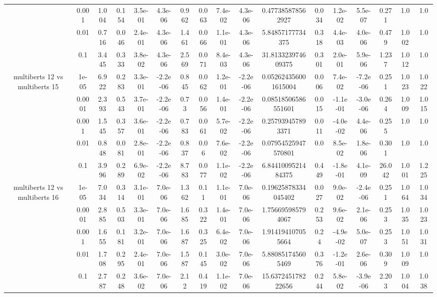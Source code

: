 \begin{tabular}{|c|c|c|c|c|c|c|c|c|c|c|c|c|c|c|c|c|}
 & 0.001 & 1.004 & 0.154 & 3.5e-01 & 4.3e-06 & 0.962 & 0.063 & 7.4e-02 & 4.3e-06 & 0.477385878562927 & 0.034 & 1.2e-02 & 5.5e-07 & 0.271 & 1.0 & 1.0 \\
 & 0.01 & 0.716 & 0.046 & 2.4e-01 & 4.3e-06 & 1.461 & 0.066 & 1.1e-01 & 4.3e-06 & 5.84857177734375 & 0.318 & 4.4e-03 & 4.0e-06 & 0.479 & 1.002 & 1.0 \\
 & 0.1 & 3.445 & 0.333 & 3.8e-02 & 4.3e-06 & 2.569 & 0.071 & 8.4e-03 & 4.3e-06 & 31.813323974609375 & 0.301 & 2.0e-01 & 5.9e-06 & 1.237 & 1.012 & 1.0 \\
\hline
\multirow{5}{*}{multiberts 12 vs multiberts 15} & 1e-05 & 6.922 & 0.283 & 3.3e-01 & -2.2e-06 & 0.845 & 0.062 & 1.2e-01 & -2.2e-06 & 0.052624356001615004 & 0.006 & 7.4e-02 & -7.2e-06 & 0.251 & 1.023 & 1.022 \\
 & 0.0001 & 2.393 & 0.543 & 3.7e-01 & -2.2e-06 & 0.73 & 0.056 & 1.4e-01 & -2.2e-06 & 0.08518506586551601 & 0.015 & -1.1e-01 & -3.0e-06 & 0.264 & 1.009 & 1.015 \\
 & 0.001 & 1.545 & 0.357 & 3.6e-01 & -2.2e-06 & 0.783 & 0.061 & 5.7e-02 & -2.2e-06 & 0.257939457893371 & 0.011 & -4.0e-02 & 4.4e-06 & 0.255 & 1.0 & 1.0 \\
 & 0.01 & 0.848 & 0.081 & 2.8e-01 & -2.2e-06 & 0.837 & 0.06 & 7.6e-02 & -2.2e-06 & 0.07954525947570801 & 0.0 & 8.5e-02 & 1.8e-06 & 0.301 & 1.0 & 1.0 \\
 & 0.1 & 3.996 & 0.289 & 6.9e-02 & -2.2e-06 & 8.783 & 0.077 & 1.1e-02 & -2.2e-06 & 6.8441009521484375 & 0.449 & -1.8e-01 & 4.1e-09 & 26.042 & 1.001 & 1.225 \\
\hline
\multirow{5}{*}{multiberts 12 vs multiberts 16} & 1e-05 & 7.034 & 0.314 & 3.1e-01 & 7.0e-06 & 1.362 & 0.11 & 1.1e-01 & 7.0e-06 & 0.19625878334045402 & 0.027 & 9.0e-02 & -2.4e-06 & 0.251 & 1.064 & 1.034 \\
 & 0.0001 & 2.885 & 0.503 & 3.3e-01 & 7.0e-06 & 1.685 & 0.322 & 1.4e-01 & 7.0e-06 & 1.756695985794067 & 0.253 & 9.6e-02 & 2.1e-06 & 0.253 & 1.035 & 1.023 \\
 & 0.001 & 1.655 & 0.181 & 3.2e-01 & 7.0e-06 & 1.687 & 0.325 & 6.4e-02 & 7.0e-06 & 1.914194107055664 & 0.24 & -4.9e-02 & 5.0e-07 & 0.253 & 1.051 & 1.031 \\
 & 0.01 & 1.708 & 0.295 & 2.4e-01 & 7.0e-06 & 1.587 & 0.145 & 3.0e-02 & 7.0e-06 & 5.880851745605469 & 0.376 & -1.2e-01 & 2.6e-06 & 0.309 & 1.009 & 1.0 \\
 & 0.1 & 2.787 & 0.248 & 3.6e-02 & 7.0e-06 & 2.12 & 0.419 & 1.1e-02 & 7.0e-06 & 15.637245178222656 & 0.244 & 5.8e-02 & -3.9e-06 & 2.203 & 1.004 & 1.038 \\

\end{tabular}
